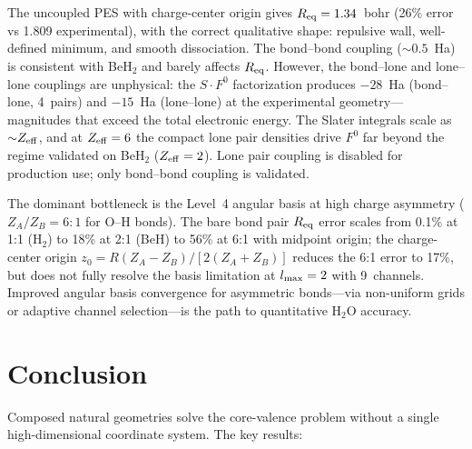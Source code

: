 \documentclass[aps,pra,twocolumn,superscriptaddress,longbibliography,floatfix]{revtex4-2}
\begin{document}
The uncoupled PES with charge-center origin gives $R_{\rm eq} = 1.34$~bohr
(26\% error vs 1.809 experimental), with the correct qualitative shape:
repulsive wall, well-defined minimum, and smooth dissociation.  The
bond--bond coupling (${\sim}0.5$~Ha) is consistent with BeH$_2$ and
barely affects $R_{\rm eq}$.  However, the bond--lone and lone--lone
couplings are unphysical: the $S \cdot F^0$ factorization produces
$-28$~Ha (bond--lone, 4~pairs) and $-15$~Ha (lone--lone) at the
experimental geometry---magnitudes that exceed the total electronic
energy.  The Slater integrals scale as ${\sim}Z_{\rm eff}$, and at
$Z_{\rm eff} = 6$ the compact lone pair densities drive $F^0$ far
beyond the regime validated on BeH$_2$ ($Z_{\rm eff} = 2$).  Lone pair
coupling is disabled for production use; only bond--bond coupling is
validated.

The dominant bottleneck is the Level~4 angular basis at high charge
asymmetry ($Z_A/Z_B = 6{:}1$ for O--H bonds).  The bare bond pair
$R_{\rm eq}$ error scales from 0.1\% at 1:1 (H$_2$) to 18\% at 2:1
(BeH) to 56\% at 6:1 with midpoint origin; the charge-center origin
$z_0 = R(Z_A - Z_B)/[2(Z_A + Z_B)]$ reduces the 6:1 error to 17\%,
but does not fully resolve the basis limitation at $l_{\rm max} = 2$
with 9~channels.  Improved angular basis convergence for asymmetric
bonds---via non-uniform grids or adaptive channel selection---is
the path to quantitative H$_2$O accuracy.


\section{Conclusion}
\label{sec:conclusion}

Composed natural geometries solve the core-valence problem without a
single high-dimensional coordinate system.  The key results:
\end{document}
